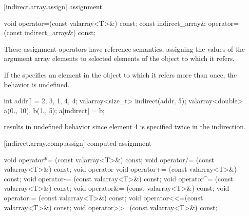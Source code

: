 [indirect.array.assign]{ assignment}

%
\begin{itemdecl}
void operator=(const valarray<T>&) const;
const indirect_array& operator=(const indirect_array&) const;
\end{itemdecl}

\begin{itemdescr}
\pnum
These assignment operators have reference semantics, assigning the values
of the argument array elements to selected elements of the
object to which it refers.

\pnum
If the
specifies an element in the
object to which it refers more than once, the behavior is undefined.
%

\pnum
\enterexample
\begin{codeblock}
int addr[] = {2, 3, 1, 4, 4};
valarray<size_t> indirect(addr, 5);
valarray<double> a(0., 10), b(1., 5);
a[indirect] = b;
\end{codeblock}
results in undefined behavior since element 4 is specified twice in the
indirection.
\exitexample
\end{itemdescr}

[indirect.array.comp.assign]{ computed assignment}

%
%
%
%
%
%
%
%
%
%
%
%
\begin{itemdecl}
void operator*= (const valarray<T>&) const;
void operator/= (const valarray<T>&) const;
void operator%
void operator+= (const valarray<T>&) const;
void operator-= (const valarray<T>&) const;
void operator^= (const valarray<T>&) const;
void operator&= (const valarray<T>&) const;
void operator|= (const valarray<T>&) const;
void operator<<=(const valarray<T>&) const;
void operator>>=(const valarray<T>&) const;
\end{itemdecl}

